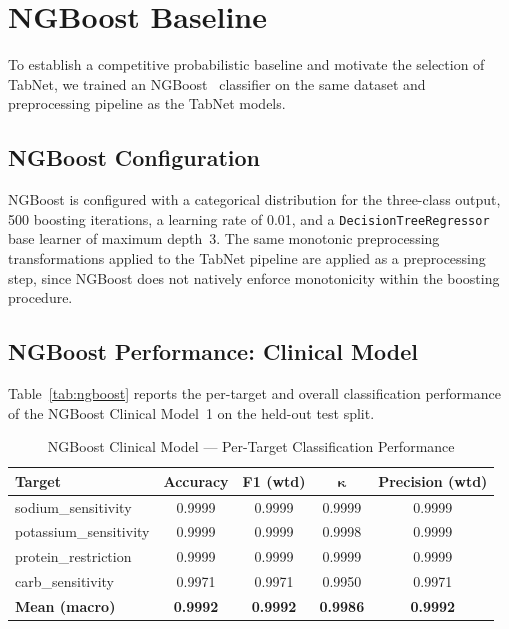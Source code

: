 \documentclass[journal]{IEEEtran}
\begin{document}
\section{NGBoost Baseline}
\label{sec:ngboost}

To establish a competitive probabilistic baseline and motivate the
selection of TabNet, we trained an NGBoost~\cite{duan2020ngboost}
classifier on the same dataset and preprocessing pipeline as the TabNet
models.

\subsection{NGBoost Configuration}

NGBoost is configured with a categorical distribution for the three-class
output, 500 boosting iterations, a learning rate of 0.01, and a
\texttt{DecisionTreeRegressor} base learner of maximum depth~3. The same
monotonic preprocessing transformations applied to the TabNet pipeline
are applied as a preprocessing step, since NGBoost does not natively
enforce monotonicity within the boosting procedure.

\subsection{NGBoost Performance: Clinical Model}

Table~\ref{tab:ngboost} reports the per-target and overall
classification performance of the NGBoost Clinical Model~1 on the
held-out test split.

\begin{table}[!t]
\centering
\caption{NGBoost Clinical Model — Per-Target Classification Performance}
\begin{tabular}{lcccc}
\hline
\textbf{Target} & \textbf{Accuracy} & \textbf{F1 (wtd)} & $\boldsymbol{\kappa}$ & \textbf{Precision (wtd)} \\
\hline
sodium\_sensitivity   & 0.9999 & 0.9999 & 0.9999 & 0.9999 \\
potassium\_sensitivity & 0.9999 & 0.9999 & 0.9998 & 0.9999 \\
protein\_restriction   & 0.9999 & 0.9999 & 0.9999 & 0.9999 \\
carb\_sensitivity      & 0.9971 & 0.9971 & 0.9950 & 0.9971 \\
\hline
\textbf{Mean (macro)} & \textbf{0.9992} & \textbf{0.9992} & \textbf{0.9986} & \textbf{0.9992} \\
\hline
\end{tabular}
\end{table}
\end{document}
